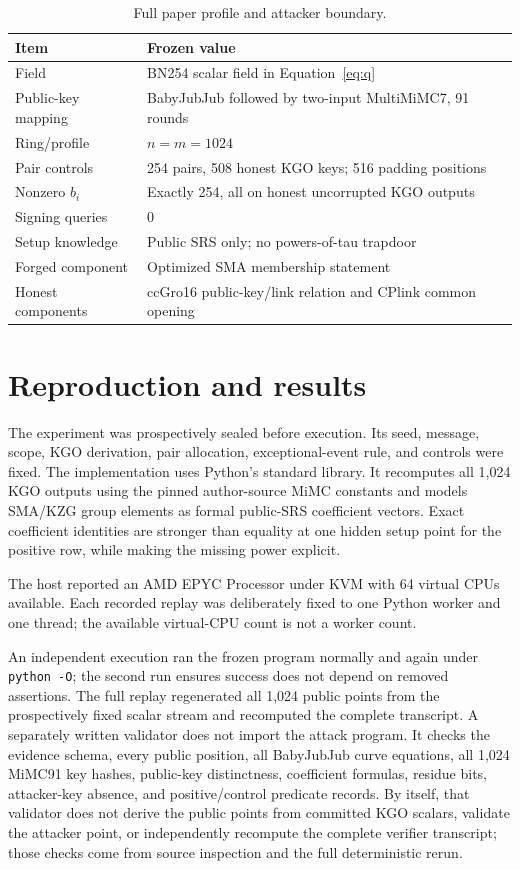 \documentclass[10pt,a4paper]{article}
\begin{document}
\begin{table}[h]
\centering
\small
\begin{tabularx}{\textwidth}{@{}lX@{}}
\toprule
Item & Frozen value \\
\midrule
Field & BN254 scalar field in Equation~\eqref{eq:q} \\
Public-key mapping & BabyJubJub followed by two-input MultiMiMC7, 91 rounds \\
Ring/profile & $n=m=1024$ \\
Pair controls & 254 pairs, 508 honest KGO keys; 516 padding positions \\
Nonzero $b_i$ & Exactly 254, all on honest uncorrupted KGO outputs \\
Signing queries & 0 \\
Setup knowledge & Public SRS only; no powers-of-tau trapdoor \\
Forged component & Optimized SMA membership statement \\
Honest components & ccGro16 public-key/link relation and CPlink common opening \\
\bottomrule
\end{tabularx}
\caption{Full paper profile and attacker boundary.}
\end{table}

\section{Reproduction and results}

The experiment was prospectively sealed before execution. Its seed, message,
scope, KGO derivation, pair allocation, exceptional-event rule, and controls
were fixed. The implementation uses Python's standard library. It recomputes
all 1,024 KGO outputs using the pinned author-source MiMC constants and models
SMA/KZG group elements as formal public-SRS coefficient vectors. Exact
coefficient identities are stronger than equality at one hidden setup point
for the positive row, while making the missing power explicit.

The host reported an AMD EPYC Processor under KVM with 64 virtual CPUs
available. Each recorded replay was deliberately fixed to one Python worker
and one thread; the available virtual-CPU count is not a worker count.

An independent execution ran the frozen program normally and again under
\texttt{python -O}; the second run ensures success does not depend on removed
assertions. The full replay regenerated all 1,024 public points from the
prospectively fixed scalar stream and recomputed the complete transcript. A
separately written validator does not import the attack program. It checks the
evidence schema, every public position, all BabyJubJub curve equations, all
1,024 MiMC91 key hashes, public-key distinctness, coefficient formulas,
residue bits, attacker-key absence, and positive/control predicate records.
By itself, that validator does not derive the public points from committed KGO
scalars, validate the attacker point, or independently recompute the complete
verifier transcript; those checks come from source inspection and the full
deterministic rerun.
\end{document}
